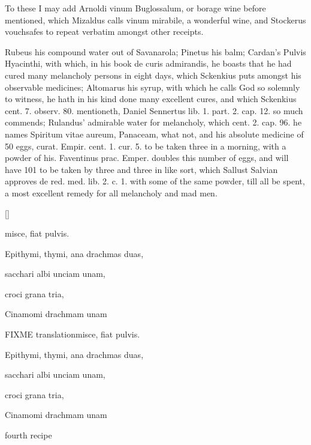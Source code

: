 To these I may add Arnoldi vinum Buglossalum, or borage wine before
mentioned, which Mizaldus calls vinum mirabile, a wonderful wine,
and Stockerus vouchsafes to repeat verbatim amongst other receipts.

Rubeus his compound water out of Savanarola; Pinetus his balm;
Cardan's Pulvis Hyacinthi, with which, in his book de curis admirandis,
he boasts that he had cured many melancholy persons in eight days,
which Sckenkius puts amongst his observable medicines; Altomarus
his syrup, with which he calls God so solemnly to witness, he
hath in his kind done many excellent cures, and which Sckenkius cent.
7. observ. 80. mentioneth, Daniel Sennertus lib. 1. part. 2. cap. 12.
so much commends; Rulandus' admirable water for melancholy, which cent.
2. cap. 96. he names Spiritum vitae aureum, Panaceam, what not, and his
absolute medicine of 50 eggs, curat. Empir. cent. 1. cur. 5. to be
taken three in a morning, with a powder of his. Faventinus prac.
Emper. doubles this number of eggs, and will have 101 to be taken by
three and three in like sort, which Sallust Salvian approves de red.
med. lib. 2. c. 1. with some of the same powder, till all be spent, a
most excellent remedy for all melancholy and mad men.

\begin{Prescription}[H]
[\baselineskip]
\begin{prescriptionbox}{}{\textlatin{misce, fiat pulvis.}}
\item \textlatin{Epithymi, thymi, ana drachmas duas},
\item \textlatin{sacchari albi unciam unam},
\item \textlatin{croci grana tria},
\item \textlatin{Cinamomi drachmam unam}
\end{prescriptionbox}
\begin{prescriptionbox}{FIXME translation}{\textlatin{misce, fiat pulvis.}}
\item \textlatin{Epithymi, thymi, ana drachmas duas},
\item \textlatin{sacchari albi unciam unam},
\item \textlatin{croci grana tria},
\item \textlatin{Cinamomi drachmam unam}
\end{prescriptionbox}
\caption{fourth recipe}
\end{Prescription}

